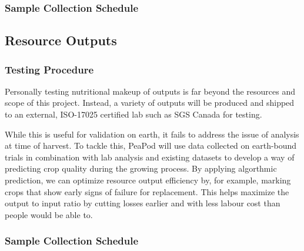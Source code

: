 \subsubsection{Sample Collection Schedule}




\clearpage

\subsection{Resource Outputs}

\subsubsection{Testing Procedure}

Personally testing nutritional makeup of outputs is far beyond the resources and scope of this project. Instead, a variety of outputs will be produced and shipped to an external, ISO-17025 certified lab such as SGS Canada for testing.

While this is useful for validation on earth, it fails to address the issue of analysis at time of harvest. To tackle this, PeaPod will use data collected on earth-bound trials in combination with lab analysis and existing datasets to develop a way of predicting crop quality during the growing process. By applying algorthmic prediction, we can optimize resource output efficiency by, for example, marking crops that show early signs of failure for replacement. This helps maximize the output to input ratio by cutting losses earlier and with less labour cost than people would be able to.



\subsubsection{Sample Collection Schedule}

